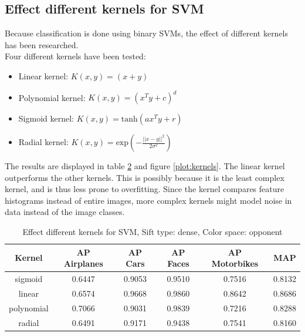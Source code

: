 \begin{table}[H]
\begin{center}
\subsection{Effect different kernels for SVM}
Because classification is done using binary SVMs, the effect of different kernels has been researched.\\
Four different kernels have been tested:
\begin{itemize}
\item Linear kernel: $K(x,y) = (x+y)$
\item Polynomial kernel: $K(x,y) = (x^Ty + c)^d$
\item Sigmoid kernel: $K(x,y) = \text{tanh}(ax^Ty + r)$
\item Radial kernel: $K(x,y) = \text{exp}(-\frac{||x-y||^2}{2\sigma^2})$
\end{itemize}
The results are displayed in table \ref{tab:kernels} and figure \ref{plot:kernels}. The linear kernel outperforms the other kernels. This is possibly because it is the least complex kernel, and is thus less prone to overfitting. Since the kernel compares feature histograms instead of entire images, more complex kernels might model noise in data instead of the image classes.

\begin{table}[H]
\begin{center}
\begin{tabular}{|c|ccccc|}
\hline
\textbf{Kernel} & \textbf{AP Airplanes} & \textbf{AP Cars} & \textbf{AP Faces} & \textbf{AP Motorbikes} & \textbf{MAP}\\
\hline
sigmoid & 0.6447 & 0.9053 & 0.9510 & 0.7516 & 0.8132\\
linear & 0.6574 & 0.9668 & 0.9860 & 0.8642 & 0.8686 \\
polynomial & 0.7066 & 0.9031 & 0.9839& 0.7216& 0.8288\\
radial & 0.6491 & 0.9171 & 0.9438 & 0.7541 & 0.8160\\
\hline
\end{tabular}
\caption{Effect different kernels for SVM, Sift type: dense, Color space: opponent}
\label{tab:kernels}
\end{center}
\end{table}


\end{center}
\end{table}

